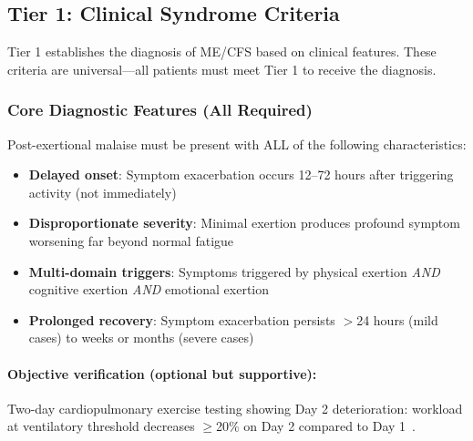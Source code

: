 \subsection{Tier 1: Clinical Syndrome Criteria}
\label{subsec:tier1}

Tier 1 establishes the diagnosis of ME/CFS based on clinical features. These criteria are universal---all patients must meet Tier 1 to receive the diagnosis.

\subsubsection{Core Diagnostic Features (All Required)}

\begin{requirement}
\label{req:pem-criterion}
Post-exertional malaise must be present with ALL of the following characteristics:

\begin{itemize}
    \item \textbf{Delayed onset}: Symptom exacerbation occurs 12--72 hours after triggering activity (not immediately)
    \item \textbf{Disproportionate severity}: Minimal exertion produces profound symptom worsening far beyond normal fatigue
    \item \textbf{Multi-domain triggers}: Symptoms triggered by physical exertion \textit{AND} cognitive exertion \textit{AND} emotional exertion
    \item \textbf{Prolonged recovery}: Symptom exacerbation persists $>$24 hours (mild cases) to weeks or months (severe cases)
\end{itemize}

\paragraph{Objective verification (optional but supportive):}
Two-day cardiopulmonary exercise testing showing Day 2 deterioration: workload at ventilatory threshold decreases $\geq$20\% on Day 2 compared to Day 1~\cite{Lim2020,keller2024cpet}.
\end{requirement}

